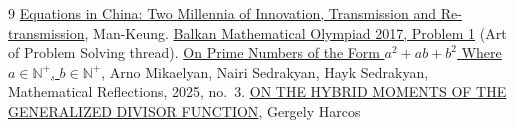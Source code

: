\documentclass[a4paper,14pt]{extarticle}  %
\begin{document}
\newpage
\begin{thebibliography}{9}
 \href{https://bibnum.publimath.fr/ACF/ACF19075.pdf}{Equations in China: Two Millennia of Innovation, Transmission and Re-transmission}, Man-Keung.
 \href{https://artofproblemsolving.com/community/c6h1441692p8209533}{Balkan Mathematical Olympiad 2017, Problem 1} (Art of Problem Solving thread).
 \href{https://www.awesomemath.org/wp-pdf-files/math-reflections/mr-2025-03/mr_3_2025_on_prime_numbers_of_the_form.pdf}{On Prime Numbers of the Form $a^2 + ab + b^2$ Where $a \in \mathbb{N}^{+}$, $b \in \mathbb{N}^{+}$}, Arno Mikaelyan, Nairi Sedrakyan, Hayk Sedrakyan, Mathematical Reflections, 2025, no.~3.
 \href{https://www.renyi.hu/~gharcos/wigert4.pdf}{ON THE HYBRID MOMENTS OF THE GENERALIZED DIVISOR FUNCTION}, Gergely Harcos
\end{thebibliography}
\end{document}

